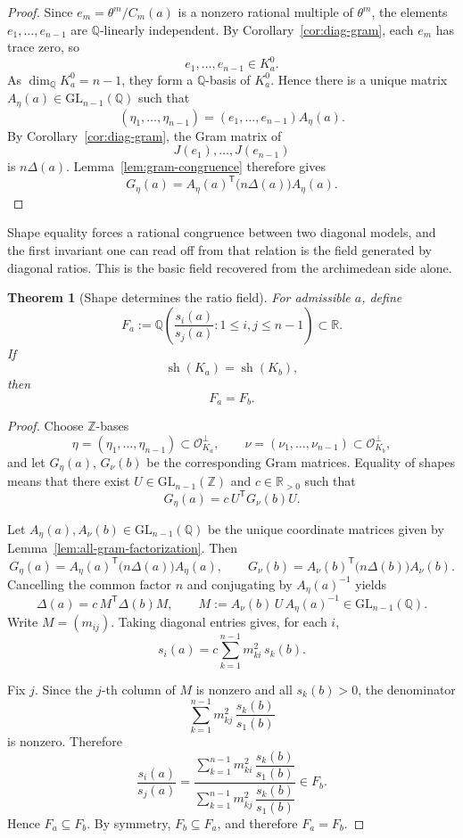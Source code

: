 \documentclass[11pt,letterpaper]{amsart}
\newcommand{\Q}{\mathbb{Q}}
\newcommand{\Z}{\mathbb{Z}}
\newcommand{\R}{\mathbb{R}}
\newcommand{\cO}{\mathcal{O}}
\newcommand{\GL}{\mathrm{GL}}
\theoremstyle{plain}
\newtheorem{theorem}{Theorem}[section]
\theoremstyle{definition}
\begin{document}
\begin{proof}
Since \(e_m=\theta^m/C_m(a)\) is a nonzero rational multiple of \(\theta^m\),
the elements \(e_1,\dots,e_{n-1}\) are \(\Q\)-linearly independent.
By Corollary~\ref{cor:diag-gram}, each \(e_m\) has trace zero, so
\[
e_1,\dots,e_{n-1}\in K_a^0.
\]
As \(\dim_\Q K_a^0=n-1\), they form a \(\Q\)-basis of \(K_a^0\).
Hence there is a unique matrix \(A_\eta(a)\in \GL_{n-1}(\Q)\) such that
\[
(\eta_1,\dots,\eta_{n-1})=(e_1,\dots,e_{n-1})A_\eta(a).
\]
By Corollary~\ref{cor:diag-gram}, the Gram matrix of
\[
J(e_1),\dots,J(e_{n-1})
\]
is \(n\Delta(a)\).
Lemma~\ref{lem:gram-congruence} therefore gives
\[
G_\eta(a)=A_\eta(a)^{\mathsf T}\bigl(n\Delta(a)\bigr)A_\eta(a).
\]
\end{proof}

Shape equality forces a rational congruence between two diagonal models, and the first invariant one can read off from that relation is the field generated by diagonal ratios. This is the basic field recovered from the archimedean side alone.


\begin{theorem}[Shape determines the ratio field]\label{thm:shape-ratio-field}
For admissible \(a\), define
\[
F_a:=\Q\!\left(\frac{s_i(a)}{s_j(a)}:1\le i,j\le n-1\right)\subset \R.
\]
If
\[
\operatorname{sh}(K_a)=\operatorname{sh}(K_b),
\]
then
\[
F_a=F_b.
\]
\end{theorem}

\begin{proof}
Choose \(\Z\)-bases
\[
\eta=(\eta_1,\dots,\eta_{n-1})\subset \cO_{K_a}^\perp,\qquad
\nu=(\nu_1,\dots,\nu_{n-1})\subset \cO_{K_b}^\perp,
\]
and let \(G_\eta(a)\), \(G_\nu(b)\) be the corresponding Gram matrices.
Equality of shapes means that there exist \(U\in \GL_{n-1}(\Z)\) and
\(c\in \R_{>0}\) such that
\[
G_\eta(a)=c\,U^{\mathsf T}G_\nu(b)U.
\]

Let \(A_\eta(a),A_\nu(b)\in \GL_{n-1}(\Q)\) be the unique coordinate matrices
given by Lemma~\ref{lem:all-gram-factorization}. Then
\[
G_\eta(a)=A_\eta(a)^{\mathsf T}\bigl(n\Delta(a)\bigr)A_\eta(a),
\qquad
G_\nu(b)=A_\nu(b)^{\mathsf T}\bigl(n\Delta(b)\bigr)A_\nu(b).
\]
Cancelling the common factor \(n\) and conjugating by \(A_\eta(a)^{-1}\)
yields
\[
\Delta(a)=c\,M^{\mathsf T}\Delta(b)M,
\qquad
M:=A_\nu(b)\,U\,A_\eta(a)^{-1}\in \GL_{n-1}(\Q).
\]
Write \(M=(m_{ij})\).
Taking diagonal entries gives, for each \(i\),
\[
s_i(a)=c\sum_{k=1}^{n-1} m_{ki}^2\,s_k(b).
\]

Fix \(j\). Since the \(j\)-th column of \(M\) is nonzero and all
\(s_k(b)>0\), the denominator
\[
\sum_{k=1}^{n-1} m_{kj}^2\,\frac{s_k(b)}{s_1(b)}
\]
is nonzero. Therefore
\[
\frac{s_i(a)}{s_j(a)}
=
\frac{\sum_{k=1}^{n-1} m_{ki}^2\,\dfrac{s_k(b)}{s_1(b)}}
     {\sum_{k=1}^{n-1} m_{kj}^2\,\dfrac{s_k(b)}{s_1(b)}}\in F_b.
\]
Hence \(F_a\subseteq F_b\).
By symmetry, \(F_b\subseteq F_a\), and therefore \(F_a=F_b\).
\end{proof}
\end{document}
